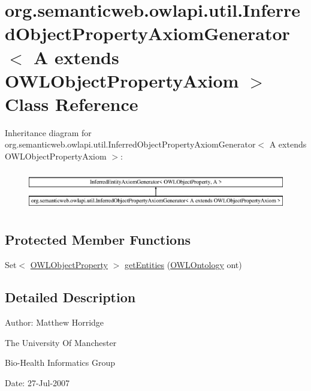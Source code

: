 \hypertarget{classorg_1_1semanticweb_1_1owlapi_1_1util_1_1_inferred_object_property_axiom_generator_3_01_a_0157202feb469e51c0b6b6c48d3f58d40c}{\section{org.\-semanticweb.\-owlapi.\-util.\-Inferred\-Object\-Property\-Axiom\-Generator$<$ A extends O\-W\-L\-Object\-Property\-Axiom $>$ Class Reference}
\label{classorg_1_1semanticweb_1_1owlapi_1_1util_1_1_inferred_object_property_axiom_generator_3_01_a_0157202feb469e51c0b6b6c48d3f58d40c}
}
Inheritance diagram for org.\-semanticweb.\-owlapi.\-util.\-Inferred\-Object\-Property\-Axiom\-Generator$<$ A extends O\-W\-L\-Object\-Property\-Axiom $>$\-:\begin{figure}[H]
\begin{center}
\leavevmode
\includegraphics[height=1.763780cm]{classorg_1_1semanticweb_1_1owlapi_1_1util_1_1_inferred_object_property_axiom_generator_3_01_a_0157202feb469e51c0b6b6c48d3f58d40c}
\end{center}
\end{figure}
\subsection*{Protected Member Functions}
\begin{DoxyCompactItemize}
\item 
Set$<$ \hyperlink{interfaceorg_1_1semanticweb_1_1owlapi_1_1model_1_1_o_w_l_object_property}{O\-W\-L\-Object\-Property} $>$ \hyperlink{classorg_1_1semanticweb_1_1owlapi_1_1util_1_1_inferred_object_property_axiom_generator_3_01_a_0157202feb469e51c0b6b6c48d3f58d40c_a22d3add38e9857556f2f10e424ec9b78}{get\-Entities} (\hyperlink{interfaceorg_1_1semanticweb_1_1owlapi_1_1model_1_1_o_w_l_ontology}{O\-W\-L\-Ontology} ont)
\end{DoxyCompactItemize}


\subsection{Detailed Description}
Author\-: Matthew Horridge\par
 The University Of Manchester\par
 Bio-\/\-Health Informatics Group\par
 Date\-: 27-\/\-Jul-\/2007\par
\par
 
